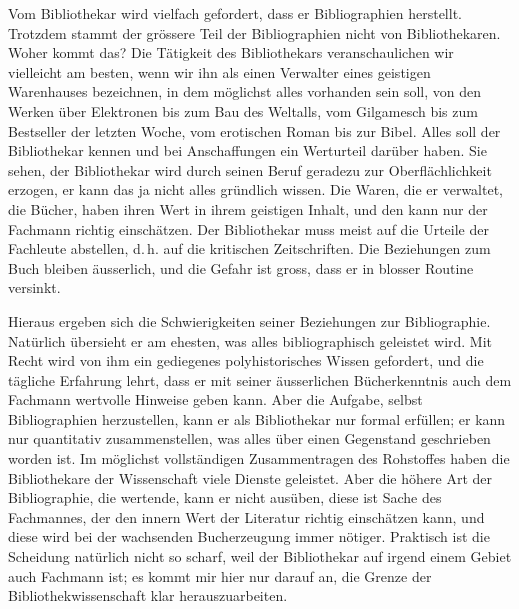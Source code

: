 \documentclass[a4paper,
fontsize=11pt,
oneside,
numbers=noperiodatend,
parskip=half-,
bibliography=totoc,
final
]{scrartcl}
\begin{document}
Vom Bibliothekar wird vielfach gefordert, dass er Bibliographien
herstellt. Trotzdem stammt der grössere Teil der Bibliographien nicht
von Bibliothekaren. Woher kommt das? Die Tätigkeit des Bibliothekars
veranschaulichen wir vielleicht am besten, wenn wir ihn als einen
Verwalter eines geistigen Warenhauses bezeichnen, in dem möglichst alles
vorhanden sein soll, von den Werken über Elektronen bis zum Bau des
Weltalls, vom Gilgamesch bis zum Bestseller der letzten Woche, vom
erotischen Roman bis zur Bibel. Alles soll der Bibliothekar kennen und
bei Anschaffungen ein Werturteil darüber haben. Sie sehen, der
Bibliothekar wird durch seinen Beruf geradezu zur Oberflächlichkeit
erzogen, er kann das ja nicht alles gründlich wissen. Die Waren, die er
verwaltet, die Bücher, haben ihren Wert in ihrem geistigen Inhalt, und
den kann nur der Fachmann richtig einschätzen. Der Bibliothekar muss
meist auf die Urteile der Fachleute abstellen, d.\,h. auf die kritischen
Zeitschriften. Die Beziehungen zum Buch bleiben äusserlich, und die
Gefahr ist gross, dass er in blosser Routine versinkt.

Hieraus ergeben sich die Schwierigkeiten seiner Beziehungen zur
Bibliographie. Natürlich übersieht er am ehesten, was alles
bibliographisch geleistet wird. Mit Recht wird von ihm ein gediegenes
polyhistorisches Wissen gefordert, und die tägliche Erfahrung lehrt,
dass er mit seiner äusserlichen Bücherkenntnis auch dem Fachmann
wertvolle Hinweise geben kann. Aber die Aufgabe, selbst Bibliographien
herzustellen, kann er als Bibliothekar nur formal erfüllen; er kann nur
quantitativ zusammenstellen, was alles über einen Gegenstand geschrieben
worden ist. Im möglichst vollständigen Zusammentragen des Rohstoffes
haben die Bibliothekare der Wissenschaft viele Dienste geleistet. Aber
die höhere Art der Bibliographie, die wertende, kann er nicht ausüben,
diese ist Sache des Fachmannes, der den innern Wert der Literatur
richtig einschätzen kann, und diese wird bei der wachsenden
Bucherzeugung immer nötiger. Praktisch ist die Scheidung natürlich nicht
so scharf, weil der Bibliothekar auf irgend einem Gebiet auch Fachmann
ist; es kommt mir hier nur darauf an, die Grenze der
Bibliothekwissenschaft klar herauszuarbeiten.
\end{document}
